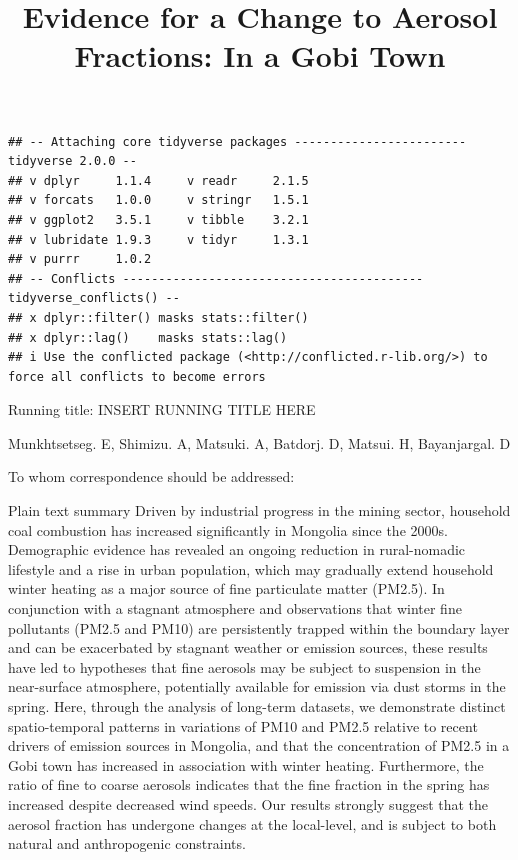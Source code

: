 \documentclass[
  11pt,
]{article}
\title{\textbf{Evidence for a Change to Aerosol Fractions: In a Gobi
Town}}
\author{}
\date{\vspace{-2.5em}}
\begin{document}
\maketitle

\begin{verbatim}
## -- Attaching core tidyverse packages ------------------------ tidyverse 2.0.0 --
## v dplyr     1.1.4     v readr     2.1.5
## v forcats   1.0.0     v stringr   1.5.1
## v ggplot2   3.5.1     v tibble    3.2.1
## v lubridate 1.9.3     v tidyr     1.3.1
## v purrr     1.0.2     
## -- Conflicts ------------------------------------------ tidyverse_conflicts() --
## x dplyr::filter() masks stats::filter()
## x dplyr::lag()    masks stats::lag()
## i Use the conflicted package (<http://conflicted.r-lib.org/>) to force all conflicts to become errors
\end{verbatim}

\vspace{35mm}

Running title: INSERT RUNNING TITLE HERE

\vspace{35mm}

Munkhtsetseg. E, Shimizu. A, Matsuki. A, Batdorj. D, Matsui. H,
Bayanjargal. D

\vspace{40mm}

To whom correspondence should be addressed:

\newpage
\linenumbers

Plain text summary Driven by industrial progress in the mining sector,
household coal combustion has increased significantly in Mongolia since
the 2000s. Demographic evidence has revealed an ongoing reduction in
rural-nomadic lifestyle and a rise in urban population, which may
gradually extend household winter heating as a major source of fine
particulate matter (PM2.5). In conjunction with a stagnant atmosphere
and observations that winter fine pollutants (PM2.5 and PM10) are
persistently trapped within the boundary layer and can be exacerbated by
stagnant weather or emission sources, these results have led to
hypotheses that fine aerosols may be subject to suspension in the
near-surface atmosphere, potentially available for emission via dust
storms in the spring. Here, through the analysis of long-term datasets,
we demonstrate distinct spatio-temporal patterns in variations of PM10
and PM2.5 relative to recent drivers of emission sources in Mongolia,
and that the concentration of PM2.5 in a Gobi town has increased in
association with winter heating. Furthermore, the ratio of fine to
coarse aerosols indicates that the fine fraction in the spring has
increased despite decreased wind speeds. Our results strongly suggest
that the aerosol fraction has undergone changes at the local-level, and
is subject to both natural and anthropogenic constraints.
\end{document}
